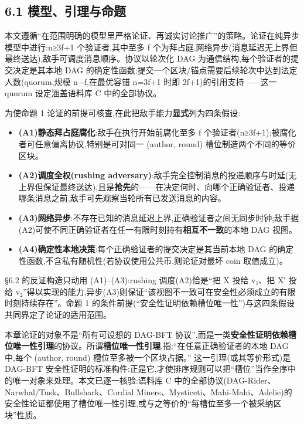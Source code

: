 \documentclass[UTF8,fontset=windows,a4paper,11pt]{ctexart}
\providecommand{\tightlist}{\setlength{\itemsep}{0pt}\setlength{\parskip}{0pt}}
\begin{document}
\subsection{6.1
模型、引理与命题}\label{ux6a21ux578bux5f15ux7406ux4e0eux547dux9898}

本文遵循``在范围明确的模型里严格论证、再诚实讨论推广''的策略。论证在纯异步模型中进行:n≥3f+1
个验证者,其中至多 f
个为拜占庭,网络异步(消息延迟无上界但最终送达),敌手可调度消息顺序。协议以轮次化
DAG 为通信结构,每个验证者的提交决定是其本地 DAG
的确定性函数;提交一个区块/锚点需要后续轮次中达到法定人数(quorum,规模
n−f,在最优容错 n=3f+1 时即 2f+1)的引用支持------这一 quorum
设定涵盖语料库 C 中的全部协议。

为使命题 1 论证的前提可核查,在此把敌手能力\textbf{显式}列为四条假设:

\begin{itemize}
\tightlist
\item
  \textbf{(A1)静态拜占庭腐化}:敌手在执行开始前腐化至多 f
  个验证者(n≥3f+1);被腐化者可任意偏离协议,特别是可对同一 (author,
  round) 槽位制造两个不同的等价区块。
\item
  \textbf{(A2)调度全权(rushing adversary)}:敌手完全控制消息的投递顺序与时延(无上界但保证最终送达),且是\textbf{抢先}的------在决定何时、向哪个正确验证者、投递哪条消息之前,敌手可先观察当轮所有已发送消息的内容。
\item
  \textbf{(A3)网络异步}:不存在已知的消息延迟上界,正确验证者之间无同步时钟;敌手据(A2)可使不同正确验证者在任一有限时刻持有\textbf{相互不一致}的本地
  DAG 视图。
\item
  \textbf{(A4)确定性本地决策}:每个正确验证者的提交决定是其当前本地 DAG
  的确定性函数,不含私有随机性(若协议使用公共币,则论证对最坏 coin
  取值成立)。
\end{itemize}

§6.2 的反证构造只动用 (A1)--(A3):rushing
调度(A2)恰是``把 X 投给 v₁、把 X′ 投给
v₂''得以实现的能力,异步(A3)则保证``该视图不一致可在安全性必须成立的有限时刻持续存在''。命题
1 的条件前提(``安全性证明依赖槽位唯一性'')与这四条假设共同界定了论证的适用范围。

本章论证的对象不是``所有可设想的 DAG-BFT
协议'',而是一类\textbf{安全性证明依赖槽位唯一性引理}的协议。所谓\textbf{槽位唯一性引理},指:``在任意正确验证者的本地
DAG 中,每个 (author, round) 槽位至多被一个区块占据。''
这一引理(或其等价形式)是 DAG-BFT
安全性证明的标准构件:正是它,才使排序规则可以把``槽位''当作全序中的唯一对象来处理。本文已逐一核验:语料库
C 中的全部协议(DAG-Rider、Narwhal/Tusk、Bullshark、Cordial
Miners、Mysticeti、Mahi-Mahi、Adelie)的安全性论证都使用了槽位唯一性引理,或与之等价的``每槽位至多一个被采纳区块''性质。
\end{document}
